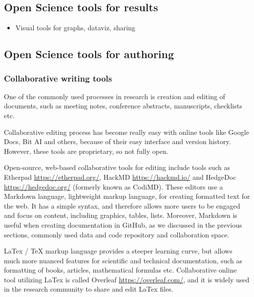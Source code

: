 \documentclass[
  letterpaper,
  DIV=11,
  numbers=noendperiod]{scrreport}
\providecommand{\tightlist}{%
  \setlength{\itemsep}{0pt}\setlength{\parskip}{0pt}}\usepackage{longtable,booktabs,array}
\begin{document}
\hypertarget{open-science-tools-for-results}{%
\subsection{Open Science tools for
results}\label{open-science-tools-for-results}}

\begin{itemize}
\tightlist
\item
  Visual tools for graphs, dataviz, sharing
\end{itemize}

\hypertarget{open-science-tools-for-authoring}{%
\subsection{Open Science tools for
authoring}\label{open-science-tools-for-authoring}}

\hypertarget{collaborative-writing-tools}{%
\subsubsection{Collaborative writing
tools}\label{collaborative-writing-tools}}

One of the commonly used processes in research is creation and editing
of documents, such as meeting notes, conference abstracts, manuscripts,
checklists etc.

Collaborative editing process has become really easy with online tools
like Google Docs, Bit AI and others, because of their easy interface and
version history. However, these tools are proprietary, so not fully
open.

Open-source, web-based collaborative tools for editing include tools
such as Etherpad \url{https://etherpad.org/}, HackMD
\url{https://hackmd.io/} and HedgeDoc \url{https://hedgedoc.org/}
(formerly known as CodiMD). These editors use a Markdown language,
lightweight markup language, for creating formatted text for the web. It
has a simple syntax, and therefore allows more users to be engaged and
focus on content, including graphics, tables, lists. Moreover, Markdown
is useful when creating documentation in GitHub, as we discussed in the
previous sections, commonly used data and code repository and
collaboration space.

LaTex / TeX markup language provides a steeper learning curve, but
allows much more nuanced features for scientific and technical
documentation, such as formatting of books, articles, mathematical
formulas etc. Collaborative online tool utilizing LaTex is called
Overleaf \url{https://overleaf.com/}, and it is widely used in the
research community to share and edit LaTex files.
\end{document}
